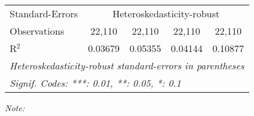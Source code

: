 \begin{table}[htbp!]
\begin{adjustbox}{width = 1\textwidth, max height = 0.95\textheight, center}
\begin{threeparttable}[b]
\begin{tabular}{lcccc}
            \midrule 
            Standard-Errors & \multicolumn{4}{c}{Heteroskedasticity-robust} \\ 
            Observations         & 22,110                         & 22,110                         & 22,110                         & 22,110\\  
            R$^2$                & 0.03679                        & 0.05355                        & 0.04144                        & 0.10877\\  
            \midrule \midrule
            \multicolumn{5}{l}{\emph{Heteroskedasticity-robust standard-errors in parentheses}}\\
            \multicolumn{5}{l}{\emph{Signif. Codes: ***: 0.01, **: 0.05, *: 0.1}}\\
         \end{tabular}
         
         \begin{tablenotes}\item \medskip \textit{Note:}
         \end{tablenotes}
      \end{threeparttable}
   \end{adjustbox}
\end{table}


